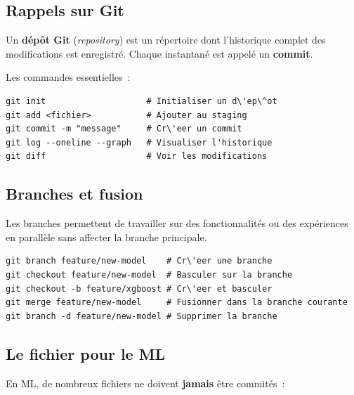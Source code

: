 \subsection{Rappels sur Git}

\begin{definition}[D\'ep\^ot Git]
Un \textbf{d\'ep\^ot Git} (\emph{repository}) est un r\'epertoire dont l'historique
complet des modifications est enregistr\'e. Chaque instantan\'e est appel\'e un
\textbf{commit}.
\end{definition}

Les commandes essentielles~:

\begin{codeblock}[title=\textbf{Commandes Git de base}]
\begin{verbatim}
git init                    # Initialiser un d\'ep\^ot
git add <fichier>           # Ajouter au staging
git commit -m "message"     # Cr\'eer un commit
git log --oneline --graph   # Visualiser l'historique
git diff                    # Voir les modifications
\end{verbatim}
\end{codeblock}

\subsection{Branches et fusion}

Les branches permettent de travailler sur des fonctionnalit\'es ou des
exp\'eriences en parall\`ele sans affecter la branche principale.

\begin{codeblock}[title=\textbf{Gestion des branches}]
\begin{verbatim}
git branch feature/new-model    # Cr\'eer une branche
git checkout feature/new-model  # Basculer sur la branche
git checkout -b feature/xgboost # Cr\'eer et basculer
git merge feature/new-model     # Fusionner dans la branche courante
git branch -d feature/new-model # Supprimer la branche
\end{verbatim}
\end{codeblock}

\subsection{Le fichier  pour le ML}

En ML, de nombreux fichiers ne doivent \textbf{jamais} \^etre commit\'es~:

